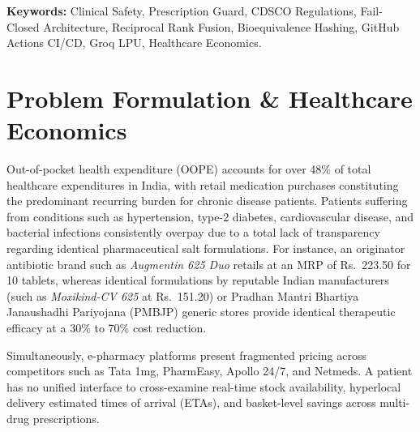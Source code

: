 \documentclass[11pt,a4paper]{article}
\begin{document}
\noindent\textbf{Keywords:} Clinical Safety, Prescription Guard, CDSCO Regulations, Fail-Closed Architecture, Reciprocal Rank Fusion, Bioequivalence Hashing, GitHub Actions CI/CD, Groq LPU, Healthcare Economics.

\vspace{1em}

\section{Problem Formulation \& Healthcare Economics}

Out-of-pocket health expenditure (OOPE) accounts for over 48\% of total healthcare expenditures in India, with retail medication purchases constituting the predominant recurring burden for chronic disease patients. Patients suffering from conditions such as hypertension, type-2 diabetes, cardiovascular disease, and bacterial infections consistently overpay due to a total lack of transparency regarding identical pharmaceutical salt formulations. For instance, an originator antibiotic brand such as \textit{Augmentin 625 Duo} retails at an MRP of Rs.~223.50 for 10 tablets, whereas identical formulations by reputable Indian manufacturers (such as \textit{Moxikind-CV 625} at Rs.~151.20) or Pradhan Mantri Bhartiya Janaushadhi Pariyojana (PMBJP) generic stores provide identical therapeutic efficacy at a 30\% to 70\% cost reduction.

Simultaneously, e-pharmacy platforms present fragmented pricing across competitors such as Tata 1mg, PharmEasy, Apollo 24/7, and Netmeds. A patient has no unified interface to cross-examine real-time stock availability, hyperlocal delivery estimated times of arrival (ETAs), and basket-level savings across multi-drug prescriptions.
\end{document}

